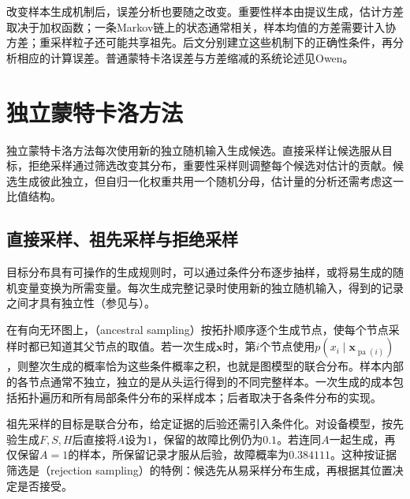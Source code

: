 改变样本生成机制后，误差分析也要随之改变。重要性样本由提议生成，估计方差取决于加权函数；一条Markov链上的状态通常相关，样本均值的方差需要计入协方差；重采样粒子还可能共享祖先。后文分别建立这些机制下的正确性条件，再分析相应的计算误差。普通蒙特卡洛误差与方差缩减的系统论述见Owen。

\section{独立蒙特卡洛方法}
\label{sec:pgm-sampling-independent}

独立蒙特卡洛方法每次使用新的独立随机输入生成候选。直接采样让候选服从目标，拒绝采样通过筛选改变其分布，重要性采样则调整每个候选对估计的贡献。候选生成彼此独立，但自归一化权重共用一个随机分母，估计量的分析还需考虑这一比值结构。

\subsection{直接采样、祖先采样与拒绝采样}
\label{sec:pgm-sampling-direct-rejection}

目标分布具有可操作的生成规则时，可以通过条件分布逐步抽样，或将易生成的随机变量变换为所需变量。每次生成完整记录时使用新的独立随机输入，得到的记录之间才具有独立性（参见与）。

在有向无环图上，（ancestral sampling）按拓扑顺序逐个生成节点，使每个节点采样时都已知道其父节点的取值。若一次生成$\bm{x}$时，第$i$个节点使用$p(x_i\mid\bm{x}_{\operatorname{pa}(i)})$，则整次生成的概率恰为这些条件概率之积，也就是图模型的联合分布。样本内部的各节点通常不独立，独立的是从头运行得到的不同完整样本。一次生成的成本包括拓扑遍历和所有局部条件分布的采样成本；后者取决于各条件分布的实现。

祖先采样的目标是联合分布，给定证据的后验还需引入条件化。对设备模型，按先验生成$F,S,H$后直接将$A$设为$1$，保留的故障比例仍为$0.1$。若连同$A$一起生成，再仅保留$A=1$的样本，所保留记录才服从后验，故障概率为$0.384111$。这种按证据筛选是（rejection sampling）的特例：候选先从易采样分布生成，再根据其位置决定是否接受。

